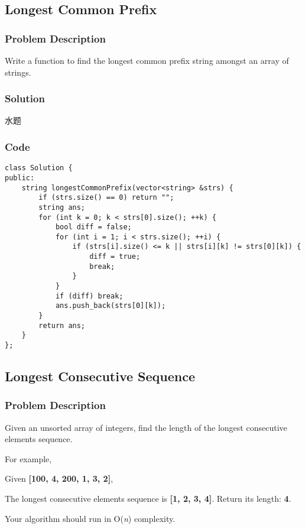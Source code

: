 \documentclass[courier]{article}
\begin{document}
\begin{CJK*}{UTF8}{gkai}
\subsection{ Longest Common Prefix }

\subsubsection*{Problem Description}
Write a function to find the longest common prefix string amongst an array of strings.



\subsubsection*{Solution}
水题

\subsubsection*{Code}
\begin{lstlisting}
class Solution {
public:
    string longestCommonPrefix(vector<string> &strs) {
        if (strs.size() == 0) return "";
        string ans;
        for (int k = 0; k < strs[0].size(); ++k) {
            bool diff = false;
            for (int i = 1; i < strs.size(); ++i) {
                if (strs[i].size() <= k || strs[i][k] != strs[0][k]) {
                    diff = true;
                    break;
                }
            }
            if (diff) break;
            ans.push_back(strs[0][k]);
        }
        return ans;
    }
}; 
\end{lstlisting}


\subsection{ Longest Consecutive Sequence }

\subsubsection*{Problem Description}
Given an unsorted array of integers, find the length of the longest consecutive elements sequence.

For example,


Given \textbf{[100, 4, 200, 1, 3, 2]},


The longest consecutive elements sequence is \textbf{[1, 2, 3, 4]}. Return its length: \textbf{4}.

Your algorithm should run in O(\emph{n}) complexity.




\end{CJK*}
\end{document}
